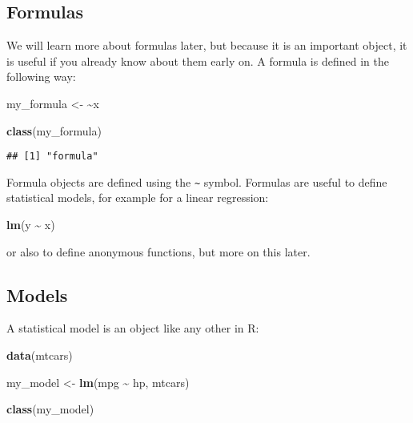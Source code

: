 \documentclass[
]{article}
\newenvironment{Shaded}{\begin{snugshade}}{\end{snugshade}}
\newcommand{\ErrorTok}[1]{\textcolor[rgb]{0.64,0.00,0.00}{\textbf{#1}}}
\newcommand{\KeywordTok}[1]{\textcolor[rgb]{0.13,0.29,0.53}{\textbf{#1}}}
\newcommand{\NormalTok}[1]{#1}
\newcommand{\OperatorTok}[1]{\textcolor[rgb]{0.81,0.36,0.00}{\textbf{#1}}}
\newcommand{\StringTok}[1]{\textcolor[rgb]{0.31,0.60,0.02}{#1}}
\begin{document}
\hypertarget{formulas}{%
\subsection{Formulas}\label{formulas}}

We will learn more about formulas later, but because it is an important object, it is useful if you
already know about them early on. A formula is defined in the following way:

\begin{Shaded}
\begin{Highlighting}[]
\NormalTok{my\_formula \textless{}{-}}\StringTok{ }\ErrorTok{\textasciitilde{}}\NormalTok{x}

\KeywordTok{class}\NormalTok{(my\_formula)}
\end{Highlighting}
\end{Shaded}

\begin{verbatim}
## [1] "formula"
\end{verbatim}

Formula objects are defined using the \texttt{\textasciitilde{}} symbol. Formulas are useful to define statistical models,
for example for a linear regression:

\begin{Shaded}
\begin{Highlighting}[]
\KeywordTok{lm}\NormalTok{(y }\OperatorTok{\textasciitilde{}}\StringTok{ }\NormalTok{x)}
\end{Highlighting}
\end{Shaded}

or also to define anonymous functions, but more on this later.

\hypertarget{models}{%
\subsection{Models}\label{models}}

A statistical model is an object like any other in R:

\begin{Shaded}
\begin{Highlighting}[]
\KeywordTok{data}\NormalTok{(mtcars)}

\NormalTok{my\_model \textless{}{-}}\StringTok{ }\KeywordTok{lm}\NormalTok{(mpg }\OperatorTok{\textasciitilde{}}\StringTok{ }\NormalTok{hp, mtcars)}

\KeywordTok{class}\NormalTok{(my\_model)}
\end{Highlighting}
\end{Shaded}
\end{document}
